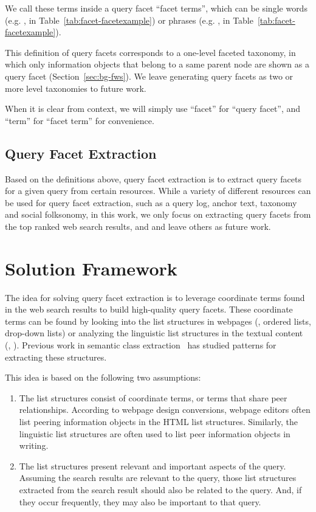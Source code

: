 We call these terms inside a query facet ``facet terms'', which can be single words (e.g. ,  in Table~\ref{tab:facet-facetexample}) or phrases (e.g. ,  in Table~\ref{tab:facet-facetexample}).

This definition of query facets corresponds to a one-level faceted taxonomy, in which only information objects that belong to a same parent node are shown as a query facet (Section~\ref{sec:bg-fws}). We leave generating query facets as two or more level taxonomies to future work.

When it is clear from context, we will simply use ``facet'' for ``query facet'', and ``term'' for ``facet term'' for convenience.

\subsection{Query Facet Extraction}
Based on the definitions above, query facet extraction is to extract query facets for a given query from certain resources. While a variety of different resources can be used for query facet extraction, such as a query log, anchor text, taxonomy and social folksonomy, in this work, we only focus on extracting query facets from the top ranked web search results, and and leave others as future work.

\section{Solution Framework}
\label{sec:facet-framework}
The idea for solving query facet extraction is to leverage coordinate terms found in the web search results to build high-quality query facets. These coordinate terms can be found by looking into the list structures in webpages (\eg, ordered lists, drop-down lists) or analyzing the linguistic list structures in the textual content (\eg, ).
Previous work in semantic class extraction~\cite{hearst1992automatic,pasca2004acquisition,kozareva2008semantic,shi2010corpus} has studied patterns for extracting these structures. 

This idea is based on the following two assumptions:
\begin{enumerate}[label={(\arabic*)}]
 \item The list structures consist of coordinate terms, or terms that share peer relationships. According to webpage design conversions, webpage editors often list peering information objects in the HTML list structures. Similarly, the linguistic list structures are often used to list peer information objects in writing.
 \item The list structures present relevant and important aspects of the query. Assuming the search results are relevant to the query, those list structures extracted from the search result should also be related to the query.  And, if they occur frequently, they may also be important to that query.
\end{enumerate}

